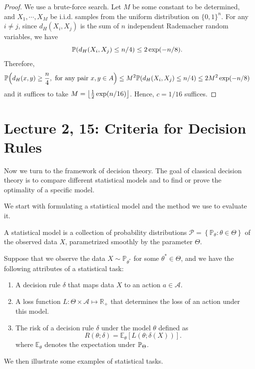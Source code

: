 \begin{proof}
    We use a brute-force search. Let $M$ be some constant to be determined, and $X_1,\cdots,X_M$ be i.i.d. samples from the uniform distribution on $\{0,1\}^n$. For any $i\neq j$, since $d_H(X_i,X_j)$ is the sum of $n$ independent Rademacher random variables, we have
    \[
    \pr\paren*{d_H(X_i,X_j)\le n/4}\le 2\exp\paren*{-n/8}.
    \]
    Therefore,
    \[
    \pr\paren*{d_H(x, y) \geq \frac{n}{4},\text { for any pair } x, y \in A }\le M^2  \pr\paren*{d_H(X_i,X_j)\le n/4}\le 2M^2\exp\paren*{-n/8}
    \]
    and it suffices to take $M=\left\lfloor\frac{1}{2}\exp(n/16)\right\rfloor$. Hence, $c=1/16$ suffices.
\end{proof}

\section{Lecture 2, 15: Criteria for Decision Rules}


Now we turn to the framework of decision theory. The goal of classical decision theory is to compare different statistical models and to find or prove the optimality of a specific model.

We start with formulating a statistical model and the method we use to evaluate it.

\begin{de}
A statistical model is a collection of probability distributions $\mathcal{P}=\left\{\mathbb{P}_\theta: \theta \in \Theta\right\}$ of the observed data $X$, parametrized smoothly by the parameter $\Theta$.

Suppose that we observe the data $X \sim \mathbb{P}_{\theta^*}$ for some $\theta^* \in \Theta$, and we have the following attributes of a statistical task:
\begin{enumerate}
    \item A decision rule $\delta$ that maps data $X$ to an action $a \in \mathcal{A}$.
    \item A loss function $L:\Theta\times\mathcal{A}\mapsto \mathbb{R}_+$ that determines the loss of an action under this model.
    \item The risk of a decision rule $\delta$ under the model $\theta$ defined as
    \[
    R(\theta;\delta) =\mathbb{E}_\theta[L(\theta ; \delta(X))] .
    \]
    where $\mathbb{E}_{\theta}$ denotes the expectation under $\mathbb{P}_{\Theta}$.
\end{enumerate}
\end{de}

We then illustrate some examples of statistical tasks.

